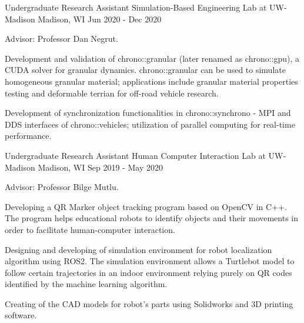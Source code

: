\begin{cventries}
  \cventry
	{Undergraduate Research Assistant} %
	{Simulation-Based Engineering Lab at UW-Madison} %
	{Madison, WI} %
	{Jun 2020 - Dec 2020} %
	{
		\begin{cvitems} %
			\item {Advisor: Professor Dan Negrut.}
			\item {Development and validation of chrono::granular (later renamed as chrono::gpu), a CUDA solver for granular dynamics. chrono::granular can be used to simulate homogeneous granular material; applications include granular material properties testing and deformable terrian for off-road vehicle research.}
			\item {Development of synchronization functionalities in chrono::synchrono - MPI and DDS interfaces of chrono::vehicles; utilization of parallel computing for real-time performance.}
		\end{cvitems}
	}



  \cventry
	{Undergraduate Research Assistant} %
	{Human Computer Interaction Lab at UW-Madison} %
	{Madison, WI} %
	{Sep 2019 - May 2020} %
	{
	  \begin{cvitems} %
		\item {Advisor: Professor Bilge Mutlu.}
		\item {Developing a QR Marker object tracking program based on OpenCV in C++. The program helps educational robots to identify objects and their movements in order to facilitate human-computer interaction.}
		\item {Designing and developing of simulation environment for robot localization algorithm using ROS2. The simulation environment allows a Turtlebot model to follow certain trajectories in an indoor environment relying purely on QR codes identified by the machine learning algorithm.}
		\item {Creating of the CAD models for robot's parts  using Solidworks and 3D printing software.}
	  \end{cvitems}
}



\end{cventries}
